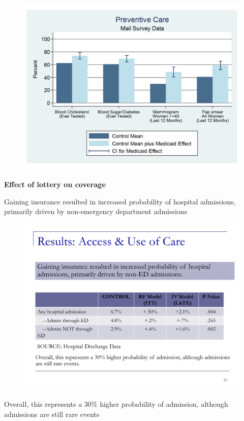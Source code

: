 \documentclass[notes=show]{beamer}
\begin{document}
\begin{frame}[plain]
	
	\begin{figure}
	\includegraphics[scale=0.40]{./lecture_includes/baicker_5.pdf}
	\end{figure}
\end{frame}

\begin{frame}[plain]
	\begin{center}
	\textbf{Effect of lottery on coverage}
	\end{center}

	 Gaining insurance resulted in increased probability of hospital admissions, primarily driven by non-emergency department admissions
		
	\begin{figure}
	\includegraphics[scale=0.40]{./lecture_includes/baicker_6.pdf}
	\end{figure}
	
	Overall, this represents a 30\% higher probability of admission, although admissions are still rare events
\end{frame}
\end{document}
